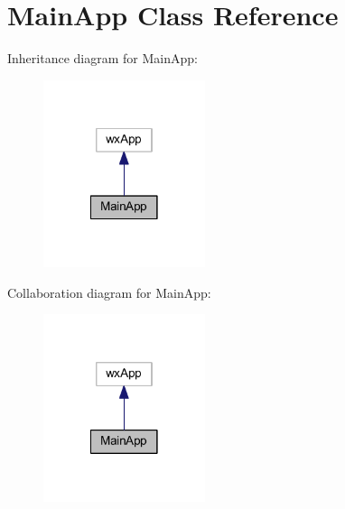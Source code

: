 \hypertarget{class_main_app}{\section{Main\-App Class Reference}
\label{class_main_app}
}


Inheritance diagram for Main\-App\-:\nopagebreak
\begin{figure}[H]
\begin{center}
\leavevmode
\includegraphics[width=134pt]{class_main_app__inherit__graph}
\end{center}
\end{figure}


Collaboration diagram for Main\-App\-:\nopagebreak
\begin{figure}[H]
\begin{center}
\leavevmode
\includegraphics[width=134pt]{class_main_app__coll__graph}
\end{center}
\end{figure}
